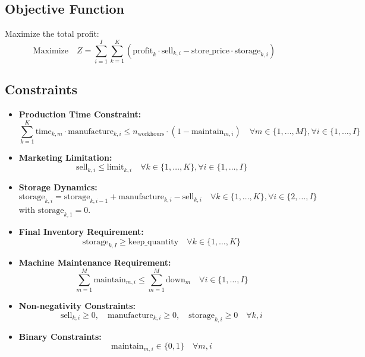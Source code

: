 \documentclass{article}
\begin{document}
\subsection*{Objective Function}
Maximize the total profit:
\[
\text{Maximize} \quad Z = \sum_{i=1}^{I} \sum_{k=1}^{K} \left( \text{profit}_{k} \cdot \text{sell}_{k, i} - \text{store\_price} \cdot \text{storage}_{k, i} \right)
\]

\subsection*{Constraints}
\begin{itemize}
    \item \textbf{Production Time Constraint:}
    \[
    \sum_{k=1}^{K} \text{time}_{k, m} \cdot \text{manufacture}_{k, i} \leq n_{\text{workhours}} \cdot (1 - \text{maintain}_{m, i}) \quad \forall m \in \{1, \ldots, M\}, \forall i \in \{1, \ldots, I\}
    \]

    \item \textbf{Marketing Limitation:}
    \[
    \text{sell}_{k, i} \leq \text{limit}_{k, i} \quad \forall k \in \{1, \ldots, K\}, \forall i \in \{1, \ldots, I\}
    \]

    \item \textbf{Storage Dynamics:}
    \[
    \text{storage}_{k, i} = \text{storage}_{k, i-1} + \text{manufacture}_{k, i} - \text{sell}_{k, i} \quad \forall k \in \{1, \ldots, K\}, \forall i \in \{2, \ldots, I\}
    \]
    with \( \text{storage}_{k, 1} = 0 \).

    \item \textbf{Final Inventory Requirement:}
    \[
    \text{storage}_{k, I} \geq \text{keep\_quantity} \quad \forall k \in \{1, \ldots, K\}
    \]
    
    \item \textbf{Machine Maintenance Requirement:}
    \[
    \sum_{m=1}^{M} \text{maintain}_{m, i} \leq \sum_{m=1}^{M} \text{down}_{m} \quad \forall i \in \{1, \ldots, I\}
    \]
    
    \item \textbf{Non-negativity Constraints:}
    \[
    \text{sell}_{k, i} \geq 0, \quad \text{manufacture}_{k, i} \geq 0, \quad \text{storage}_{k, i} \geq 0 \quad \forall k, i
    \]

    \item \textbf{Binary Constraints:}
    \[
    \text{maintain}_{m, i} \in \{0, 1\} \quad \forall m, i
    \]
\end{itemize}
\end{document}
